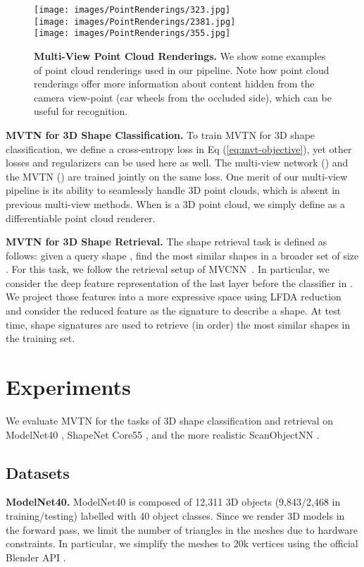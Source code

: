 \documentclass[10pt,twocolumn,letterpaper]{article}
\newcommand{\eqLabel}[1]{{Eq (#1)}}
\newcommand{\mysection}[1]{\noindent\textbf{#1.}}
\begin{document}
\begin{figure}[t]
    \centering
    \texttt{[image: images/PointRenderings/323.jpg]}\\
    \texttt{[image: images/PointRenderings/2381.jpg]} \\
    \texttt{[image: images/PointRenderings/355.jpg]}
    \caption{\textbf{Multi-View Point Cloud Renderings.} We show some examples of point cloud renderings used in our pipeline. Note how point cloud renderings offer more information about content hidden from the camera view-point (\eg car wheels from the occluded side), which can be useful for recognition.}
    \label{fig:point-rendring}
\end{figure}
\mysection{MVTN for 3D Shape Classification} \label{sec:mmtd-cls}
To train MVTN for 3D shape classification, 
we define a cross-entropy loss in \eqLabel{\ref{eq:mvt-objective}},
yet other losses and regularizers can be used here as well. The multi-view network () and the MVTN () are trained jointly on the same loss. 
One merit of our multi-view pipeline is its ability to seamlessly handle 3D point clouds, which is absent in previous multi-view methods. When  is a 3D point cloud, we simply define  as a differentiable point cloud renderer.

\vspace{1pt}\mysection{MVTN for 3D Shape Retrieval} \label{sec:mmtd-retr}
The shape retrieval task is defined as follows: given a query shape , find the most similar shapes in a broader set of size .
For this task, we follow the retrieval setup of MVCNN~\cite{mvcnn}. In particular, we consider the deep feature representation of the last layer before the classifier in . We project those features into a more expressive space using LFDA reduction \cite{sugiyama2007dimensionality} and consider the reduced feature as the signature to describe a shape. At test time, shape signatures are used to retrieve (in order) the most similar shapes in the training set.




\section{Experiments} \label{sec:experiments}
We evaluate MVTN for the tasks of 3D shape classification and retrieval on  ModelNet40 \cite{modelnet}, ShapeNet Core55 \cite{shapenet}, and the more realistic ScanObjectNN \cite{scanobjectnn}.
\subsection{Datasets}
\vspace{-4pt}
\mysection{ModelNet40}
ModelNet40 \cite{modelnet} is composed of 12,311 3D objects (9,843/2,468 in training/testing) labelled with 40 object classes. Since we render 3D models in the forward pass, we limit the number of triangles in the meshes due to hardware constraints. 
In particular, we simplify the meshes to 20k vertices using the official Blender API \cite{blender,mesh-simplify}.
\end{document}
